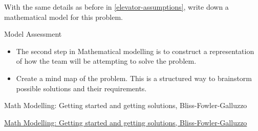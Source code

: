 \newpage

\question

With the same details as before in \ref{elevator-assumptions}, write down a mathematical model for this problem.
















\newpage


%
%



\begin{module}{Model Assessment}
	\label{analysis}

	
	
\end{module}



\begin{lesson}

	\begin{itemize}
		\item The second step in Mathematical modelling is to construct a representation of how the team will be attempting to solve the problem.
		\item Create a mind map of the problem. This is a structured way to brainstorm possible solutions and their requirements.
	\end{itemize}
	

\begin{annotation}
	\begin{goals}
	Math Modelling: Getting started and getting solutions, Bliss-Fowler-Galluzzo
	
	\hfill {}	
	\end{goals}
\end{annotation}
	 \href{https://m3challenge.siam.org/resources/modeling-handbook}{Math Modelling: Getting started and getting solutions, Bliss-Fowler-Galluzzo}

\end{lesson}




